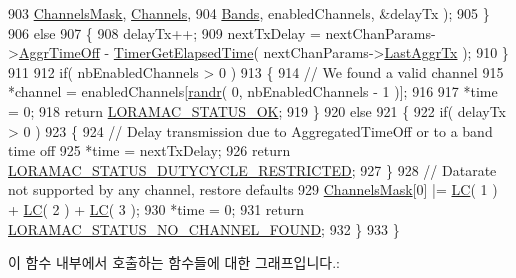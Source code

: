 \begin{DoxyCode}
903                                                       \mbox{\hyperlink{_region_e_u868_8c_a2188957b5ca6af8092154d7ccbfa5757}{ChannelsMask}}, 
      \mbox{\hyperlink{_region_e_u868_8c_a2f381382b4cbbe721da7b980ec467229}{Channels}},
904                                                       \mbox{\hyperlink{_region_e_u868_8c_a47eef5d43d561ee2fcab661437818ae3}{Bands}}, enabledChannels, &delayTx );
905     \}
906     \textcolor{keywordflow}{else}
907     \{
908         delayTx++;
909         nextTxDelay = nextChanParams->\mbox{\hyperlink{structs_next_chan_params_a3609676d2d3b7c00e25615324b35cb26}{AggrTimeOff}} - 
      \mbox{\hyperlink{time_server_8c_a9ca7e27f3d6474daff63f2e093a2e91e}{TimerGetElapsedTime}}( nextChanParams->\mbox{\hyperlink{structs_next_chan_params_a381b728f60b185ecf3313e974c18768b}{LastAggrTx}} );
910     \}
911 
912     \textcolor{keywordflow}{if}( nbEnabledChannels > 0 )
913     \{
914         \textcolor{comment}{// We found a valid channel}
915         *channel = enabledChannels[\mbox{\hyperlink{utilities_8c_af5d8ad6dae489ac64821e7d4f004595d}{randr}}( 0, nbEnabledChannels - 1 )];
916 
917         *time = 0;
918         \textcolor{keywordflow}{return} \mbox{\hyperlink{group___l_o_r_a_m_a_c_gga1d18f26b344040b3ec5c3db662919661a03db5fca052313edb3823c014b653a74}{LORAMAC\_STATUS\_OK}};
919     \}
920     \textcolor{keywordflow}{else}
921     \{
922         \textcolor{keywordflow}{if}( delayTx > 0 )
923         \{
924             \textcolor{comment}{// Delay transmission due to AggregatedTimeOff or to a band time off}
925             *time = nextTxDelay;
926             \textcolor{keywordflow}{return} \mbox{\hyperlink{group___l_o_r_a_m_a_c_gga1d18f26b344040b3ec5c3db662919661a0c982ada0769ecee2e1041fb6945ddd4}{LORAMAC\_STATUS\_DUTYCYCLE\_RESTRICTED}};
927         \}
928         \textcolor{comment}{// Datarate not supported by any channel, restore defaults}
929         \mbox{\hyperlink{_region_e_u868_8c_a2188957b5ca6af8092154d7ccbfa5757}{ChannelsMask}}[0] |= \mbox{\hyperlink{group___r_e_g_i_o_n_ga12fa17e5c1016e01a9d82c25027deb1b}{LC}}( 1 ) + \mbox{\hyperlink{group___r_e_g_i_o_n_ga12fa17e5c1016e01a9d82c25027deb1b}{LC}}( 2 ) + \mbox{\hyperlink{group___r_e_g_i_o_n_ga12fa17e5c1016e01a9d82c25027deb1b}{LC}}( 3 );
930         *time = 0;
931         \textcolor{keywordflow}{return} \mbox{\hyperlink{group___l_o_r_a_m_a_c_gga1d18f26b344040b3ec5c3db662919661a393266a9952cf6617917f1fce181efcd}{LORAMAC\_STATUS\_NO\_CHANNEL\_FOUND}};
932     \}
933 \}
\end{DoxyCode}
이 함수 내부에서 호출하는 함수들에 대한 그래프입니다.\+:
\mbox{\label{group___r_e_g_i_o_n_e_u868_gae57b8f1a0b5e45ab2371fbc0737322a7}} 
